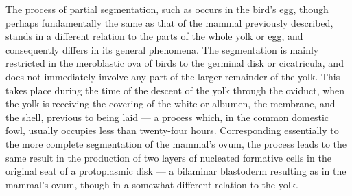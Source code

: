 \documentclass[a4paper, 11pt, oneside, english]{article}
\begin{document}
The process of partial segmentation, such as occurs in the bird's egg, though perhaps fundamentally the same as that of the mammal previously described, stands in a different relation to the parts of the whole yolk or egg, and consequently differs in its general phenomena. The segmentation is mainly restricted in the meroblastic ova of birds to the germinal disk or cicatricula, and does not immediately involve any part of the larger remainder of the yolk. This takes place during the time of the descent of the yolk through the oviduct, when the yolk is receiving the covering of the white or albumen, the membrane, and the shell, previous to being laid --- a process which, in the common domestic fowl, usually occupies less than twenty-four hours. Corresponding essentially to the more complete segmentation of the mammal's ovum, the process leads to the same result in the production of two layers of nucleated formative cells in the original seat of a protoplasmic disk --- a bilaminar blastoderm resulting as in the mammal's ovum, though in a somewhat different relation to the yolk.
\end{document}
